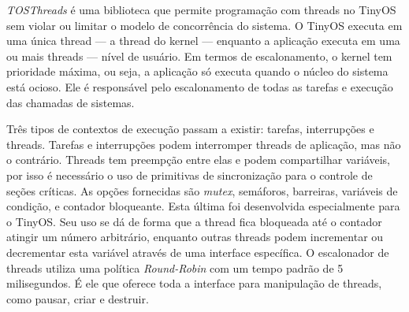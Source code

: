 
\textit{TOSThreads} é uma biblioteca que permite programação com threads no TinyOS sem violar ou limitar o modelo de concorrência do
sistema. O TinyOS executa em uma única thread --- a thread do kernel --- enquanto a aplicação executa 
em uma ou mais threads --- nível de usuário.
Em termos de escalonamento, o kernel tem prioridade máxima, ou seja, a aplicação só executa quando o núcleo do sistema
está ocioso. Ele é responsável pelo escalonamento de todas as tarefas e execução das chamadas de sistemas. 


Três tipos de contextos de execução passam a existir: tarefas, interrupções e threads. Tarefas e interrupções podem
interromper threads de aplicação, mas não o contrário. Threads tem preempção entre elas e podem compartilhar variáveis, 
por isso é necessário o uso de primitivas de sincronização para o controle de seções críticas. 
As opções fornecidas são \textit{mutex}, semáforos, barreiras, variáveis de condição, e contador
bloqueante. Esta última foi desenvolvida especialmente para o TinyOS. Seu uso se dá de forma que a thread fica bloqueada
até o contador atingir um número arbitrário, enquanto outras threads podem incrementar ou decrementar esta variável
através de uma interface específica.
O escalonador de threads utiliza uma política \textit{Round-Robin} com um tempo padrão de 5 milisegundos. É ele que oferece
toda a interface para manipulação de threads, como pausar, criar e destruir. 

